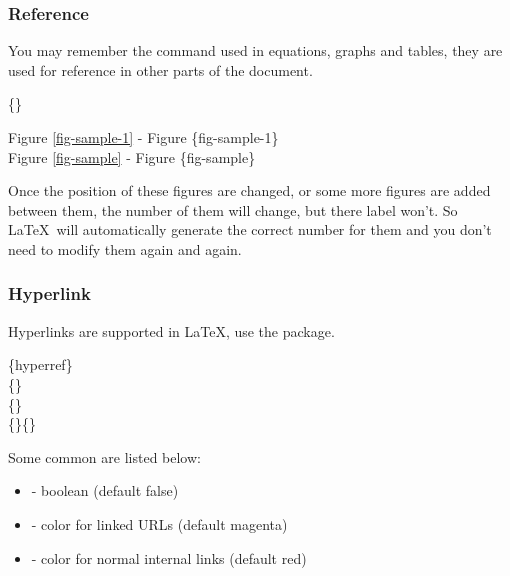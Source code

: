 \begin{frame}
	\frametitle{Reference}
	You may remember the  command used in equations, graphs and tables, they are used for reference in other parts of the document.
	\begin{command}
		\{\}
	\end{command}
	\begin{example}
		Figure \ref{fig-sample-1} - Figure \{fig-sample-1\}\\
		Figure \ref{fig-sample} - Figure \{fig-sample\}
	\end{example}
	Once the position of these figures are changed, or some more figures are added between them, the number of them will change, but there label won't. So \LaTeX\ will automatically generate the correct number for them and you don't need to modify them again and again.
\end{frame}

\begin{frame}
	\frametitle{Hyperlink}
	Hyperlinks are supported in \LaTeX, use the  package.
	\begin{command}
		\{hyperref\}\\
		\{\structure{options}\}\\
		\{\structure{url}\}\\
		\{\}\{\structure{text}\}
	\end{command}
	Some common  are listed below: 
	\begin{itemize}
		\item {} - boolean (default false)
		\item {} - color for linked URLs (default magenta)
		\item {} - color for normal internal links (default red)
	\end{itemize}
\end{frame}

